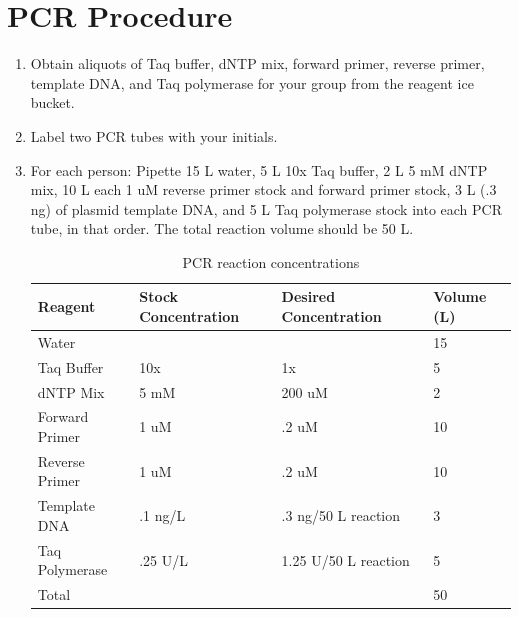 \documentclass[letterpaper]{article}
\newcommand{\uL}{\micro{}L}
\begin{document}
\section{PCR Procedure}%
\begin{enumerate} %
\item{Obtain aliquots of Taq buffer, dNTP mix, forward primer, reverse primer, template DNA, and Taq polymerase for your group from the reagent ice bucket.}
\item{Label two PCR tubes with your initials.}
\item{For each person: Pipette 15 \uL{} water, 5 \uL{} 10x Taq buffer, 2 \uL{} 5 mM dNTP mix, 10 \uL{} each 1 uM reverse primer stock and forward primer stock, 3 \uL{} (.3 ng) of plasmid template DNA, and 5 \uL{} Taq polymerase stock into each PCR tube, in that order. The total reaction volume should be 50 \uL{}.}
\begin{table}[ht]
\centering
\caption{PCR reaction concentrations}
\label{my-label}
\begin{tabular}{|l|l|l|l|}
\hline
Reagent        & Stock Concentration & Desired Concentration & Volume (\uL{}) \\ \hline
Water          &                     &                       & 15       \\ \hline
Taq Buffer     & 10x                 & 1x                    & 5           \\ \hline
dNTP Mix       & 5 mM               & 200 uM                & 2           \\ \hline
Forward Primer & 1 uM               & .2 uM                 & 10         \\ \hline
Reverse Primer & 1 uM               & .2 uM                 & 10         \\ \hline
Template DNA   & .1 ng/\uL{}             & .3 ng/50 \uL{} reaction   & 3           \\ \hline
Taq Polymerase & .25 U/\uL{}            & 1.25 U/50 \uL{} reaction & 5         \\ \hline
Total          &                     &                       & 50          \\ \hline
\end{tabular}
\end{table}


\end{enumerate}
\end{document}
